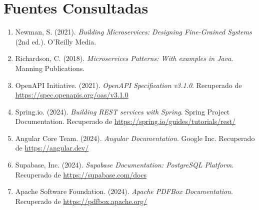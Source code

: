 \section{Fuentes Consultadas}\label{sec:fuentes}

\begin{enumerate}
    \item Newman, S. (2021). \textit{Building Microservices: Designing Fine-Grained Systems} (2nd ed.). O'Reilly Media.
    \item Richardson, C. (2018). \textit{Microservices Patterns: With examples in Java}. Manning Publications.
    \item OpenAPI Initiative. (2021). \textit{OpenAPI Specification v3.1.0}. Recuperado de \url{https://spec.openapis.org/oas/v3.1.0}
    \item Spring.io. (2024). \textit{Building REST services with Spring}. Spring Project Documentation. Recuperado de \url{https://spring.io/guides/tutorials/rest/}
    \item Angular Core Team. (2024). \textit{Angular Documentation}. Google Inc. Recuperado de \url{https://angular.dev/}
    \item Supabase, Inc. (2024). \textit{Supabase Documentation: PostgreSQL Platform}. Recuperado de \url{https://supabase.com/docs}
    \item Apache Software Foundation. (2024). \textit{Apache PDFBox Documentation}. Recuperado de \url{https://pdfbox.apache.org/}
\end{enumerate}
